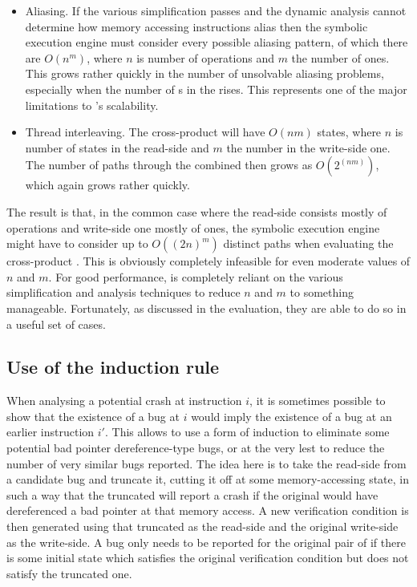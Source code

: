 \begin{itemize}
\item
  Aliasing.  If the various simplification passes and the dynamic
  analysis cannot determine how memory accessing instructions alias
  then the symbolic execution engine must consider every possible
  aliasing pattern, of which there are $O(n^m)$, where $n$ is number
  of  operations and $m$ the number of  ones.
  This grows rather quickly in the number of unsolvable aliasing
  problems, especially when the number of s in the
  {\StateMachine} rises.  This represents one of the major limitations
  to \technique's scalability.
\item
  Thread interleaving.  The cross-product {\StateMachine} will have
  $O(nm)$ states, where $n$ is number of states in the read-side
  {\StateMachine} and $m$ the number in the write-side one.  The
  number of paths through the combined {\StateMachine} then grows as
  $O(2^(nm))$, which again grows rather quickly.
\end{itemize}

The result is that, in the common case where the read-side
{\StateMachine} consists mostly of  operations and
write-side one mostly of  ones, the symbolic execution
engine might have to consider up to $O((2n)^m)$ distinct paths when
evaluating the cross-product {\StateMachine}.  This is obviously
completely infeasible for even moderate values of $n$ and $m$.  For
good performance, {\technique} is completely reliant on the various
simplification and analysis techniques to reduce $n$ and $m$ to
something manageable.  Fortunately, as discussed in the evaluation,
they are able to do so in a useful set of cases.

\subsection{Use of the induction rule}

When analysing a potential crash at instruction $i$, it is sometimes
possible to show that the existence of a bug at $i$ would imply the
existence of a bug at an earlier instruction $i'$.  This allows
{\technique} to use a form of induction to eliminate some potential
bad pointer dereference-type bugs, or at the very lest to reduce the
number of very similar bugs reported.  The idea here is to take the
read-side {\StateMachine} from a candidate bug and truncate it,
cutting it off at some memory-accessing state, in such a way that the
truncated {\StateMachine} will report a crash if the original
{\StateMachine} would have dereferenced a bad pointer at that memory
access.  A new verification condition is then generated using that
truncated {\StateMachine} as the read-side {\StateMachine} and the
original write-side {\StateMachine} as the write-side.  A bug only
needs to be reported for the original pair of {\StateMachines} if
there is some initial state which satisfies the original verification
condition but does not satisfy the truncated one.

